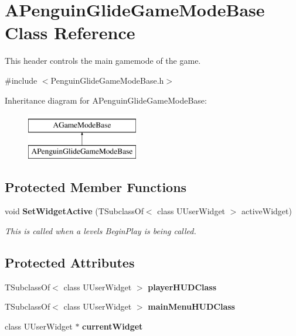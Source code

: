 \section{A\+Penguin\+Glide\+Game\+Mode\+Base Class Reference}
\label{class_a_penguin_glide_game_mode_base}


This header controls the main gamemode of the game.  




{\ttfamily \#include $<$Penguin\+Glide\+Game\+Mode\+Base.\+h$>$}

Inheritance diagram for A\+Penguin\+Glide\+Game\+Mode\+Base\+:\begin{figure}[H]
\begin{center}
\leavevmode
\includegraphics[height=2.000000cm]{class_a_penguin_glide_game_mode_base}
\end{center}
\end{figure}
\subsection*{Protected Member Functions}
\begin{DoxyCompactItemize}
\item 
void \textbf{ Set\+Widget\+Active} (T\+Subclass\+Of$<$ class U\+User\+Widget $>$ active\+Widget)
\begin{DoxyCompactList}\small\item\em This is called when a level\textquotesingle{}s Begin\+Play is being called. \end{DoxyCompactList}\end{DoxyCompactItemize}
\subsection*{Protected Attributes}
\begin{DoxyCompactItemize}
\item 
T\+Subclass\+Of$<$ class U\+User\+Widget $>$ \textbf{ player\+H\+U\+D\+Class}
\item 
T\+Subclass\+Of$<$ class U\+User\+Widget $>$ \textbf{ main\+Menu\+H\+U\+D\+Class}
\item 
class U\+User\+Widget $\ast$ \textbf{ current\+Widget}
\end{DoxyCompactItemize}
